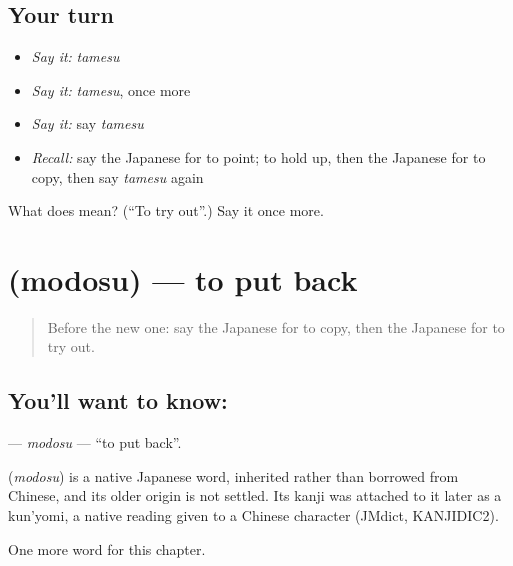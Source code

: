 \subsection*{Your turn}
\begin{itemize}
\raggedright
  \item \emph{Say it:} \emph{tamesu}
  \item \emph{Say it:} \emph{tamesu}, once more
  \item \emph{Say it:} say \emph{tamesu}
  \item \emph{Recall:} say the Japanese for to point; to hold up, then the Japanese for to copy, then say \emph{tamesu} again
\end{itemize}

\begin{tcolorbox}[breakable,colback=teal!4,colframe=teal!35!black,title={Before you move on}]
What does  mean? (\textquotedblleft{}To try out\textquotedblright{}.) Say it once more.
\end{tcolorbox}
\section[\texorpdfstring{\ja{もどす} (modosu)}{もどす (modosu)}]{ (modosu) — to put back}

\label{lesson:JA-C88-modosu}



\begin{quote}
Before the new one: say the Japanese for to copy, then the Japanese for to try out.
\end{quote}

\subsection*{You'll want to know: }
\textbf{} — \emph{modosu} — \textquotedblleft{}to put back\textquotedblright{}.

\begin{cousinweb}
\textbf{} (\emph{modosu}) is a native Japanese word, inherited rather than borrowed from Chinese, and its older origin is not settled. Its kanji was attached to it later as a kun'yomi, a native reading given to a Chinese character (JMdict, KANJIDIC2).
\end{cousinweb}

\begin{grammarlens}[title={What you've built}]
One more word for this chapter.
\end{grammarlens}

